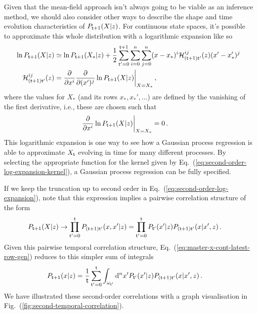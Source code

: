 Given that the mean-field approach isn't always going to be viable as an inference method, we should also consider other ways to describe the shape and time evolution characteristics of $P_{{\sf t}+1}(X\vert z)$. For continuous state spaces, it's possible to approximate this whole distribution with a logarithmic expansion like so
\begin{align}
\ln P_{{\sf t}+1}(X\vert z) &\simeq \ln P_{{\sf t}+1}(X_*\vert z) + \frac{1}{2}\sum_{{\sf t}'=0}^{{\sf t}+1}\sum_{i=0}^{n}\sum_{j=0}^{n} (x-x_*)^i {\cal H}^{ij}_{({\sf t}+1){\sf t}'}(z) (x'-x'_*)^j \label{eq:second-order-log-expansion} \\
{\cal H}^{ij}_{({\sf t}+1){\sf t}'}(z) &= \frac{\partial}{\partial x^i}\frac{\partial}{\partial (x')^j}\ln P_{{\sf t}+1}(X\vert z) \bigg\vert_{X=X_*} \label{eq:second-order-log-expansion-kernel} \,,
\end{align}
where the values for $X_*$ (and its rows $x_*, x_*', \dots$) are defined by the vanishing of the first derivative, i.e., these are chosen such that
\begin{align}
\frac{\partial}{\partial x^i}\ln P_{{\sf t}+1}(X\vert z) \bigg\vert_{X=X_*} &= 0 \,.
\end{align}
This logarithmic expansion is one way to see how a Gaussian process regression is able to approximate $X_{{\sf t}}$ evolving in time for many different processes. By selecting the appropriate function for the kernel given by Eq.~(\ref{eq:second-order-log-expansion-kernel}), a Gaussian process regression can be fully specified.

If we keep the truncation up to second order in Eq.~(\ref{eq:second-order-log-expansion}), note that this expression implies a pairwise correlation structure of the form
\begin{align}
P_{{\sf t}+1}(X\vert z) &\rightarrow \prod_{{\sf t}'=0}^{{\sf t}}P_{({\sf t}+1){\sf t}'}(x,x'\vert z) = \prod_{{\sf t}'=0}^{{\sf t}}P_{{\sf t}'}(x'\vert z)P_{({\sf t}+1){\sf t}'}(x\vert x', z) \,.
\end{align}
Given this pairwise temporal correlation structure, Eq.~(\ref{eq:master-x-cont-latest-row-gen}) reduces to this simpler sum of integrals
\begin{align}
P_{{\sf t}+1}(x\vert z) &= \frac{1}{{\sf t}}\sum_{{\sf t}'=0}^{{\sf t}}\int_{\omega_{{\sf t}'}}{\rm d}^nx' P_{{\sf t}'}(x'\vert z)P_{({\sf t}+1){\sf t}'}(x\vert x',z) \label{eq:second-order-correl} \,.
\end{align}
We have illustrated these second-order correlations with a graph visualisation in Fig.~(\ref{fig:second-temporal-correlation}).

